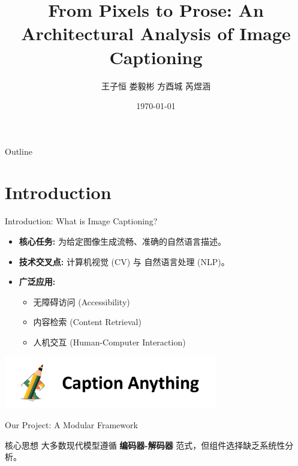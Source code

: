 \documentclass{beamer}
\title[Image Captioning]{From Pixels to Prose: An Architectural Analysis of Image Captioning}
\author{
  \begin{CJK}{UTF8}{gbsn}王子恒 \quad 娄毅彬 \quad 方酉城 \quad 芮煜涵\end{CJK}
}
\date{\today}
\institute{SUSTech/Computer Vision} %
\begin{document}
\begin{CJK}{UTF8}{gbsn}

\begin{frame}
  \titlepage
\end{frame}

\begin{frame}{Outline}
  \tableofcontents
\end{frame}

\section{Introduction}

\begin{frame}{Introduction: What is Image Captioning?}
  \begin{itemize}
    \item \textbf{核心任务:} 为给定图像生成流畅、准确的自然语言描述。
    \item \textbf{技术交叉点:} 计算机视觉 (CV) 与 自然语言处理 (NLP)。
    \item \textbf{广泛应用:}
      \begin{itemize}
        \item 无障碍访问 (Accessibility)
        \item 内容检索 (Content Retrieval)
        \item 人机交互 (Human-Computer Interaction)
      \end{itemize}
  \end{itemize}
  \vfill
  \begin{center}
      \includegraphics[width=0.7\textwidth]{images/project_logo.png}
  \end{center}
\end{frame}

\begin{frame}{Our Project: A Modular Framework}
    \begin{block}{核心思想}
        大多数现代模型遵循 \textbf{编码器-解码器} 范式，但组件选择缺乏系统性分析。
    \end{block}
    

\end{frame}
\end{CJK}
\end{document}
